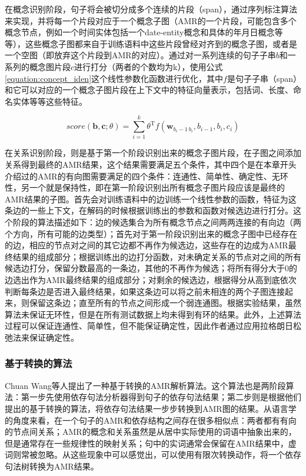 \documentclass[master, winfont]{njuthesis}
\begin{document}
在概念识别阶段，句子将会被切分成多个连续的片段（span），通过序列标注算法来实现，并将每一个片段对应于一个概念子图（AMR的一个片段，可能包含多个概念节点，例如一个时间实体包括一个date-entity概念和具体的年月日概念等等），这些概念子图都来自于训练语料中这些片段曾经对齐到的概念子图，或者是一个空图（即放弃这个片段到AMR的对应）。通过对一系列连续的句子子串\textbf{$b$}和一系列的概念图片段\textbf{$c$}进行打分（两者的个数均为k），使用公式\ref{equation:concept_iden}这个线性参数化函数进行优化，其中\textbf{$f$}是句子子串（span）和它可以对应的一个概念子图片段在上下文中的特征向量表示，包括词、长度、命名实体等等这些特征。

\begin{equation}
	\label{concept_iden}
	score(\textbf{b}, \textbf{c}; \textbf{$\theta$})=\sum_{i=1}^{k}\textbf{$\theta$}^\mathrm{T}f(\textbf{w}_{b_i-1\:b_i}, b_{i-1}, b_i, c_i)
\end{equation}

在关系识别阶段，则是基于第一个阶段识别出来的概念子图片段，在子图之间添加关系得到最终的AMR结果，这个结果需要满足五个条件，其中四个是在本章开头介绍过的AMR的有向图需要满足的四个条件：连通性、简单性、确定性、无环性，另一个就是保持性，即在第一阶段识别出所有概念子图片段应该是最终的AMR结果的子图。首先会对训练语料中的边训练一个线性参数的函数，特征为这条边的一些上下文，在解码的时候根据训练出的参数和函数对候选边进行打分。这个阶段的算法描述如下：边的候选集合为所有概念节点之间两两连接的有向边（两个方向，所有可能的边类型）；首先对于第一阶段识别出来的概念子图中已经存在的边，相应的节点对之间的其它边都不再作为候选边，这些存在的边成为AMR最终结果的组成部分；根据训练出的边打分函数，对未确定关系的节点对之间的所有候选边打分，保留分数最高的一条边，其他的不再作为候选；将所有得分大于0的边选出作为AMR最终结果的组成部分；对剩余的候选边，根据得分从高到底依次判断每条边是否进入最终结果，如果这条边可以将之前未相连的两个子图连接起来，则保留这条边；直至所有的节点之间形成一个弱连通图。根据实验结果，虽然算法未保证无环性，但是在所有测试数据上均未得到有环的结果。此外，上述算法过程可以保证连通性、简单性，但不能保证确定性，因此作者通过应用拉格朗日松弛法来保证确定性。

\subsubsection{基于转换的算法}
Chuan Wang等人\cite{Wang2015}提出了一种基于转换的AMR解析算法。这个算法也是两阶段算法：第一步先使用依存句法分析器得到句子的依存句法结果；第二步则是根据他们提出的基于转换的算法，将依存句法结果一步步转换到AMR图的结果。从语言学的角度来看，在一个句子的AMR和依存结构之间存在很多相似点：两者都有有向的节点间关系；AMR的概念和关系虽然是从居中实际使用的词语中抽象出来的，但是通常存在一些规律性的映射关系；句中的实词通常会保留在AMR结果中，虚词则常被忽略。从这些现象中可以感觉出，可以使用有限次转换动作，将一个依存句法树转换为AMR结果。
\end{document}
